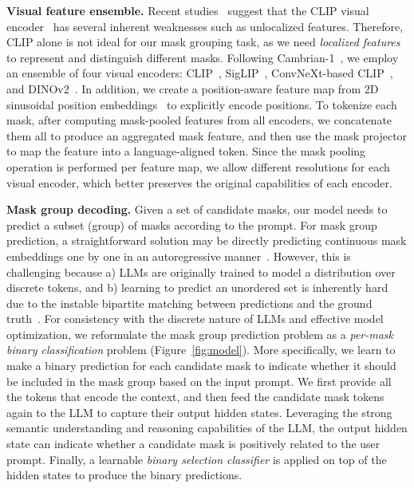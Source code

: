 \noindent\textbf{Visual feature ensemble.} Recent studies~\cite{tong2024eyes,tong2024cambrian} suggest that the CLIP visual encoder~\cite{radford2021learning} has several inherent weaknesses such as unlocalized features. Therefore, CLIP alone is not ideal for our mask grouping task, as we need \emph{localized features} to represent and distinguish different masks. Following Cambrian-1~\cite{tong2024cambrian}, we employ an ensemble of four visual encoders: CLIP~\cite{radford2021learning}, SigLIP~\cite{zhai2023sigmoid}, ConvNeXt-based CLIP~\cite{liu2022convnet, cherti2023reproducible}, and DINOv2~\cite{oquab2023dinov2}. In addition, we create a position-aware feature map from 2D sinusoidal position embeddings~\cite{dosovitskiy2021image} to explicitly encode positions. To tokenize each mask, after computing mask-pooled features from all encoders, we concatenate them all to produce an aggregated mask feature, and then use the mask projector to map the feature into a language-aligned token. Since the mask pooling operation is performed per feature map, we allow different resolutions for each visual encoder, which better preserves the original capabilities of each encoder.

\noindent\textbf{Mask group decoding.} Given a set of candidate masks, our model needs to predict a subset (group) of masks according to the prompt. For mask group prediction, a straightforward solution may be directly predicting continuous mask embeddings one by one in an autoregressive manner~\cite{lai2024lisa, xia2024gsva, zhang2024groundhog}. However, this is challenging because a) LLMs are originally trained to model a distribution over discrete tokens, and b) learning to predict an unordered set is inherently hard due to the instable bipartite matching between predictions and the ground truth~\cite{sun2021rethinking}. For consistency with the discrete nature of LLMs and effective model optimization, we reformulate the mask group prediction problem as a \emph{per-mask binary classification} problem (Figure~\ref{fig:model}). More specifically, we learn to make a binary prediction for each candidate mask to indicate whether it should be included in the mask group based on the input prompt. We first provide all the tokens that encode the context, and then feed the candidate mask tokens again to the LLM to capture their output hidden states. Leveraging the strong semantic understanding and reasoning capabilities of the LLM, the output hidden state can indicate whether a candidate mask is positively related to the user prompt. Finally, a learnable \emph{binary selection classifier} is applied on top of the hidden states to produce the binary predictions.

